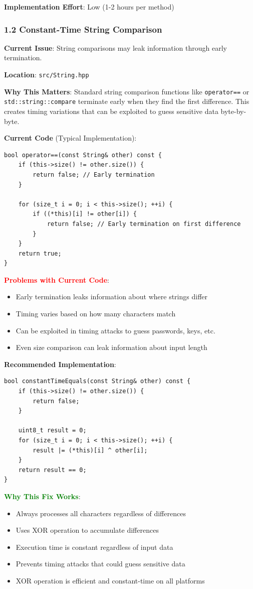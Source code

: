 \documentclass[11pt,a4paper]{article}
\begin{document}
\textbf{Implementation Effort}: Low (1-2 hours per method)

\subsubsection{1.2 Constant-Time String Comparison}

\textbf{Current Issue}: String comparisons may leak information through early termination.

\textbf{Location}: \texttt{src/String.hpp}

\textbf{Why This Matters}: Standard string comparison functions like \texttt{operator==} or \texttt{std::string::compare} terminate early when they find the first difference. This creates timing variations that can be exploited to guess sensitive data byte-by-byte.

\textbf{Current Code} (Typical Implementation):
\begin{lstlisting}
bool operator==(const String& other) const {
    if (this->size() != other.size()) {
        return false; // Early termination
    }
    
    for (size_t i = 0; i < this->size(); ++i) {
        if ((*this)[i] != other[i]) {
            return false; // Early termination on first difference
        }
    }
    return true;
}
\end{lstlisting}

\textcolor{red}{\textbf{Problems with Current Code}}:
\begin{itemize}
    \item Early termination leaks information about where strings differ
    \item Timing varies based on how many characters match
    \item Can be exploited in timing attacks to guess passwords, keys, etc.
    \item Even size comparison can leak information about input length
\end{itemize}

\textbf{Recommended Implementation}:
\begin{lstlisting}
bool constantTimeEquals(const String& other) const {
    if (this->size() != other.size()) {
        return false;
    }
    
    uint8_t result = 0;
    for (size_t i = 0; i < this->size(); ++i) {
        result |= (*this)[i] ^ other[i];
    }
    return result == 0;
}
\end{lstlisting}

\textcolor{green}{\textbf{Why This Fix Works}}:
\begin{itemize}
    \item Always processes all characters regardless of differences
    \item Uses XOR operation to accumulate differences
    \item Execution time is constant regardless of input data
    \item Prevents timing attacks that could guess sensitive data
    \item XOR operation is efficient and constant-time on all platforms
\end{itemize}
\end{document}
